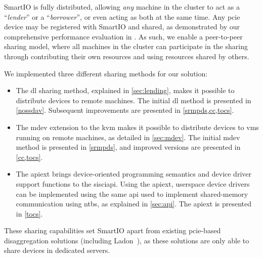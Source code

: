 


\objdistributed*%
%
%
%
SmartIO is fully distributed, allowing \emph{any} machine in the cluster to act as a ``\emph{\gls{lender}}'' or a ``\emph{\gls{borrower}}'', or even acting as both at the same time.
%
Any \gls{pcie} device may be registered with SmartIO and shared, as demonstrated by our comprehensive performance evaluation in .
%
As such, we enable a peer-to-peer sharing model, where all machines in the cluster can participate in the sharing through contributing their own resources and using resources shared by others.


We implemented three different sharing methods for our solution: 
%
\begin{itemize}
    \item The \gls{dl} sharing method, explained in \cref{sec:lending}, makes it possible to distribute devices to remote machines.
        The initial \gls{dl} method is presented in \cref{nossdav}. Subsequent improvements are presented in \cref{srmpds,cc,tocs}.



    \item The \gls{mdev} extension to the \gls{kvm} makes it possible to distribute devices to \glspl{vm} running on remote machines, as detailed in \cref{sec:mdev}.
        The initial \gls{mdev} method is presented in \cref{srmpds}, and improved versions are presented in \cref{cc,tocs}.



    \item The \gls{apiext} brings device-oriented programming semantics and device driver support functions to the \gls{sisciapi}.
        Using the \gls{apiext}, \gls{userspace} device drivers can be implemented using the same \gls{api} used to implement shared-memory communication using \glspl{ntb}, as explained in \cref{sec:api}.
        The \gls{apiext} is presented in \cref{tocs}.
\end{itemize}
%
These sharing capabilities set SmartIO apart from existing \gls{pcie}-based \gls{disaggregation} solutions (including Ladon~\cite{Tu2013}), as these solutions are only able to share devices in dedicated servers.




